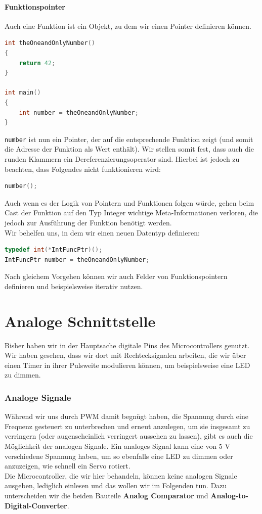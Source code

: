 \documentclass[11pt,a4paper]{scrartcl}
\begin{document}
\subsection{Funktionspointer}
Auch eine Funktion ist ein Objekt, zu dem wir einen Pointer definieren können.
\begin{lstlisting}[language=C]
int theOneandOnlyNumber() 
{
	return 42;
}

int main() 
{
	int number = theOneandOnlyNumber;
}
\end{lstlisting}
\texttt{number} ist nun ein Pointer, der auf die entsprechende Funktion zeigt (und somit die Adresse der Funktion als Wert enthält). Wir stellen somit fest, dass auch die runden Klammern ein Dereferenzierungsoperator sind. Hierbei ist jedoch zu beachten, dass Folgendes nicht funktionieren wird:
\begin{lstlisting}[language=C]
number();
\end{lstlisting}
Auch wenn es der Logik von Pointern und Funktionen folgen würde, gehen beim Cast der Funktion auf den Typ Integer wichtige Meta-Informationen verloren, die jedoch zur Ausführung der Funktion benötigt werden. \\
Wir behelfen uns, in dem wir einen neuen Datentyp definieren:
\begin{lstlisting}[language=C]
typedef int(*IntFuncPtr)();
IntFuncPtr number = theOneandOnlyNumber;
\end{lstlisting}
Nach gleichem Vorgehen können wir auch Felder von Funktionspointern definieren und beispielsweise iterativ nutzen.
\pagebreak
\part{Analoge Schnittstelle}
Bisher haben wir in der Hauptsache digitale Pins des Microcontrollers genutzt. Wir haben gesehen, dass wir dort mit Rechtecksignalen arbeiten, die wir über einen Timer in ihrer Pulsweite modulieren können, um beispielsweise eine LED zu dimmen. 
\section{Analoge Signale}
Während wir uns durch PWM damit begnügt haben, die Spannung durch eine Frequenz gesteuert zu unterbrechen und erneut anzulegen, um sie insgesamt zu verringern (oder augenscheinlich verringert aussehen zu lassen), gibt es auch die Möglichkeit der analogen Signale. Ein analoges Signal kann eine von 5 V verschiedene Spannung haben, um so ebenfalls eine LED zu dimmen oder anzuzeigen, wie schnell ein Servo rotiert. \\
Die Microcontroller, die wir hier behandeln, können keine analogen Signale ausgeben, lediglich einlesen und das wollen wir im Folgenden tun. Dazu unterscheiden wir die beiden Bauteile \textbf{Analog Comparator} und \textbf{Analog-to-Digital-Converter}.
\end{document}
